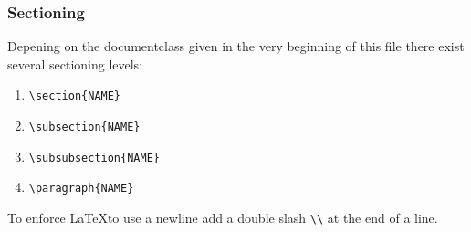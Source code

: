 \documentclass[10pt,a4paper]{scrartcl}
\begin{document}
\subsubsection{Sectioning}
Depening on the documentclass given in the very beginning of this file there
exist several sectioning levels:
\begin{enumerate}
	\item{} \verb$\section{NAME}$
	\item{} \verb$\subsection{NAME}$
	\item{} \verb$\subsubsection{NAME}$
	\item{} \verb$\paragraph{NAME}$
\end{enumerate}

\noindent To enforce \LaTeX to use a newline add a double slash \verb$\\$ at 
the end of a line.
\end{document}
